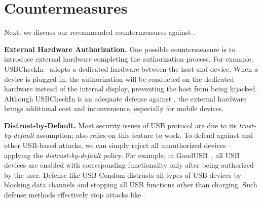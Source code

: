 \section{Countermeasures}
\label{sec:countermeasures}

Next, we discuss our recommended countermeasures against \tool.

\textbf{External Hardware Authorization.} One possible countermeasure is to
introduce external hardware completing the authorization process. For example,
 \mbox{USBCheckIn}~\cite{usbcheckin} adopts a dedicated hardware between
the host and device. When a device is plugged-in, the authorization will be
conducted on the dedicated hardware instead of the internal display, preventing
the host from being hijacked. Although \mbox{USBCheckIn} is an adequate defense against
\tool, the external hardware brings additional cost and inconvenience,
especially for mobile devices.

\textbf{Distrust-by-Default.} Most security issues of \ac{USB} protocol are due to
its \textit{trust-by-default} assumption; \tool also relies on this feature to work.
To defend against \tool and other USB-based attacks, we can simply reject all
{unauthorized} devices -- applying the \textit{distrust-by-default} policy. For example, 
in GoodUSB~\cite{tian2015defending}, all \ac{USB} devices are enabled with corresponding 
functionality only after being authorized by the user. 
Defense like USB Condom distrusts all types of \ac{USB} devices by blocking data channels and stopping all \ac{USB} functions other than charging.
Such defense methods effectively stop attacks 
like \tool.

